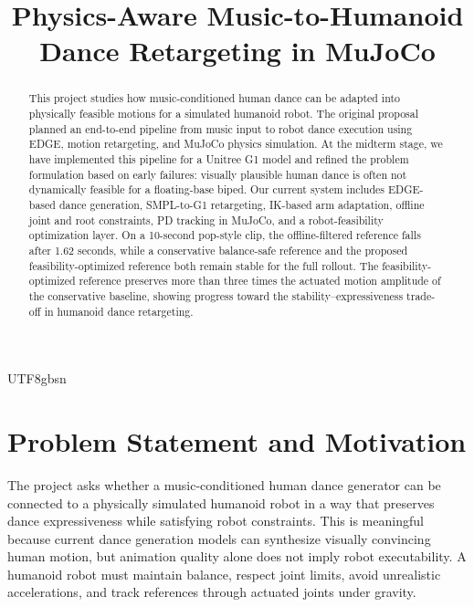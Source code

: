 \documentclass[conference]{IEEEtran}
\begin{document}
\begin{CJK*}{UTF8}{gbsn}

\title{Physics-Aware Music-to-Humanoid Dance Retargeting in MuJoCo}

\author{
}

\maketitle

\begin{abstract}
This project studies how music-conditioned human dance can be adapted into physically feasible motions for a simulated humanoid robot. The original proposal planned an end-to-end pipeline from music input to robot dance execution using EDGE, motion retargeting, and MuJoCo physics simulation. At the midterm stage, we have implemented this pipeline for a Unitree G1 model and refined the problem formulation based on early failures: visually plausible human dance is often not dynamically feasible for a floating-base biped. Our current system includes EDGE-based dance generation, SMPL-to-G1 retargeting, IK-based arm adaptation, offline joint and root constraints, PD tracking in MuJoCo, and a robot-feasibility optimization layer. On a 10-second pop-style clip, the offline-filtered reference falls after 1.62 seconds, while a conservative balance-safe reference and the proposed feasibility-optimized reference both remain stable for the full rollout. The feasibility-optimized reference preserves more than three times the actuated motion amplitude of the conservative baseline, showing progress toward the stability--expressiveness trade-off in humanoid dance retargeting.
\end{abstract}

\IEEEpeerreviewmaketitle

\section{Problem Statement and Motivation}
The project asks whether a music-conditioned human dance generator can be connected to a physically simulated humanoid robot in a way that preserves dance expressiveness while satisfying robot constraints. This is meaningful because current dance generation models can synthesize visually convincing human motion, but animation quality alone does not imply robot executability. A humanoid robot must maintain balance, respect joint limits, avoid unrealistic accelerations, and track references through actuated joints under gravity.


\end{CJK*}
\end{document}
